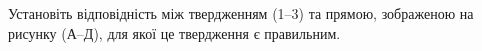\documentclass[12pt]{article}
\begin{document}
\begin{samepage}
\noindent\zadnum Установіть відповідність між твердженням \mbox{(1--3)} та прямою, зображеною на рисунку \mbox{(А--Д)}, для якої це твердження є правильним. 

\nmtnobreak
\nopagebreak\nbvspace{0.3cm}

\nmtnobreak
\noindent
\begin{minipage}[t]{0.60\textwidth}
\end{minipage}%
\hfill
\begin{minipage}[t]{0.30\textwidth}
    \nopagebreak\nbvspace{0.5cm}
    \matchingGrid
\end{minipage}

\nmtnobreak
\nopagebreak\nbvspace{0.5cm}


\end{samepage}
\end{document}
